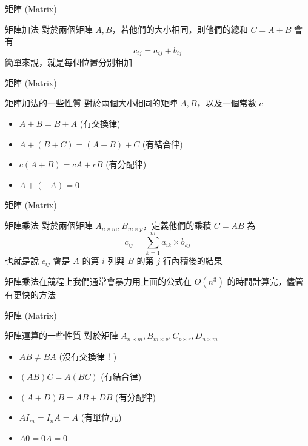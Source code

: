 \documentclass[aspectratio=169]{beamer}
\begin{document}
    \begin{frame}{矩陣 (Matrix)}
        \begin{block}{矩陣加法}
            對於兩個矩陣 $A, B$，若他們的大小相同，則他們的總和 $C = A+B$ 會有
            $$c_{ij} = a_{ij} + b_{ij}$$
            簡單來說，就是每個位置分別相加
        \end{block}
    \end{frame}
    
    \begin{frame}{矩陣 (Matrix)}
        \begin{block}{矩陣加法的一些性質}
            對於兩個大小相同的矩陣 $A,B$，以及一個常數 $c$
            \begin{itemize}
                \item $A+B = B+A$ (有交換律)
                \item $A+(B+C) = (A+B)+C$ (有結合律)
                \item $c(A+B) = cA + cB$ (有分配律)
                \item $A + (-A) = 0$
            \end{itemize}
        \end{block}
    \end{frame}
    
    \begin{frame}{矩陣 (Matrix)}
        \begin{block}{矩陣乘法}
            對於兩個矩陣 $A_{n \times m}, B_{m \times p}$，定義他們的乘積 $C = AB$ 為
            $$c_{ij} = \sum_{k=1}^m a_{ik} \times b_{kj}$$
            也就是說 $c_{ij}$ 會是 $A$ 的第 $i$ 列與 $B$ 的第 $j$ 行內積後的結果
            
            矩陣乘法在競程上我們通常會暴力用上面的公式在 $O(n^3)$ 的時間計算完，儘管有更快的方法
        \end{block}
    \end{frame}
    
    \begin{frame}{矩陣 (Matrix)}
        \begin{block}{矩陣運算的一些性質}
            對於矩陣 $A_{n \times m}, B_{m \times p}, C_{p \times r}, D_{n \times m}$
            \begin{itemize}
                \item $AB \ne BA$ (沒有交換律！)
                \item $(AB)C = A(BC)$ (有結合律)
                \item $(A+D)B = AB + DB$ (有分配律)
                \item $AI_m = I_nA = A$ (有單位元)
                \item $A0 = 0A = 0$
            \end{itemize}
        \end{block}
    \end{frame}
    
\end{document}
